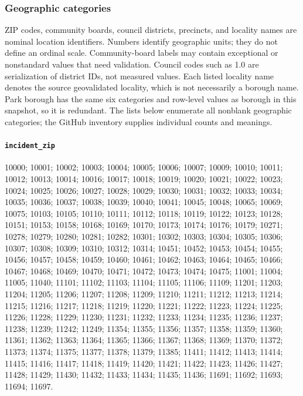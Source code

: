 \subsubsection*{Geographic categories}
ZIP codes, community boards, council districts, precincts, and locality names are nominal location identifiers. Numbers identify geographic units; they do not define an ordinal scale. Community-board labels may contain exceptional or nonstandard values that need validation. Council codes such as 1.0 are serialization of district IDs, not measured values. Each listed locality name denotes the source geovalidated locality, which is not necessarily a borough name. Park borough has the same six categories and row-level values as borough in this snapshot, so it is redundant. The lists below enumerate all nonblank geographic categories; the GitHub inventory supplies individual counts and meanings.
\paragraph{\texttt{incident\_\allowbreak{}zip}} 10000; 10001; 10002; 10003; 10004; 10005; 10006; 10007; 10009; 10010; 10011; 10012; 10013; 10014; 10016; 10017; 10018; 10019; 10020; 10021; 10022; 10023; 10024; 10025; 10026; 10027; 10028; 10029; 10030; 10031; 10032; 10033; 10034; 10035; 10036; 10037; 10038; 10039; 10040; 10041; 10045; 10048; 10065; 10069; 10075; 10103; 10105; 10110; 10111; 10112; 10118; 10119; 10122; 10123; 10128; 10151; 10153; 10158; 10168; 10169; 10170; 10173; 10174; 10176; 10179; 10271; 10278; 10279; 10280; 10281; 10282; 10301; 10302; 10303; 10304; 10305; 10306; 10307; 10308; 10309; 10310; 10312; 10314; 10451; 10452; 10453; 10454; 10455; 10456; 10457; 10458; 10459; 10460; 10461; 10462; 10463; 10464; 10465; 10466; 10467; 10468; 10469; 10470; 10471; 10472; 10473; 10474; 10475; 11001; 11004; 11005; 11040; 11101; 11102; 11103; 11104; 11105; 11106; 11109; 11201; 11203; 11204; 11205; 11206; 11207; 11208; 11209; 11210; 11211; 11212; 11213; 11214; 11215; 11216; 11217; 11218; 11219; 11220; 11221; 11222; 11223; 11224; 11225; 11226; 11228; 11229; 11230; 11231; 11232; 11233; 11234; 11235; 11236; 11237; 11238; 11239; 11242; 11249; 11354; 11355; 11356; 11357; 11358; 11359; 11360; 11361; 11362; 11363; 11364; 11365; 11366; 11367; 11368; 11369; 11370; 11372; 11373; 11374; 11375; 11377; 11378; 11379; 11385; 11411; 11412; 11413; 11414; 11415; 11416; 11417; 11418; 11419; 11420; 11421; 11422; 11423; 11426; 11427; 11428; 11429; 11430; 11432; 11433; 11434; 11435; 11436; 11691; 11692; 11693; 11694; 11697.

